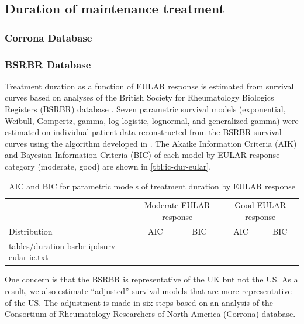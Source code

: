 \documentclass[11pt,final,fleqn]{article}\usepackage[]{graphicx}\usepackage[]{color}
\makeatletter
\theoremstyle{plain}
\newcommand*\ExpandableInput[1]{\@@input#1 }
\makeatother
\begin{document}
\subsection{Duration of maintenance treatment}\label{duration-of-maintenance-treatment}
\subsubsection{Corrona Database}\label{sec:ttd-corrona}
\subsubsection{BSRBR Database}\label{sec:ttd-bsrbr}
Treatment duration as a function of EULAR response is estimated from survival curves based on analyses of the British Society for Rheumatology Biologics Registers (BSRBR) database \citep{stevenson2016adalimumab}. Seven parametric survival models (exponential, Weibull, Gompertz, gamma, log-logistic, lognormal, and generalized gamma) were estimated on individual patient data reconstructed from the BSRBR survival curves using the algorithm developed in \citet{guyot2012enhanced}. The Akaike Information Criteria (AIK) and Bayesian Information Criteria (BIC) of each model by EULAR response category (moderate, good) are shown in \autoref{tbl:ic-dur-eular}.



\begin{table}[!ht]
\begin{center}
\begin{threeparttable}
\caption{AIC and BIC for parametric models of treatment duration by EULAR response} \label{tbl:ic-dur-eular}
\begin{tabularx}{\textwidth}{@{\extracolsep{\fill}}lcccc}
\hline
\multicolumn{1}{l}{} & \multicolumn{2}{c}{Moderate EULAR response} & \multicolumn{2}{c}{Good EULAR response} \\
\cmidrule{2-3} \cmidrule{4-5}
\multicolumn{1}{l}{Distribution} & \multicolumn{1}{c}{AIC} & \multicolumn{1}{c}{BIC} & \multicolumn{1}{c}{AIC}  & \multicolumn{1}{c}{BIC}   \\
\hline
\ExpandableInput{tables/duration-bsrbr-ipdsurv-eular-ic.txt}
\hline
\end{tabularx}
\end{threeparttable}
\end{center}
\end{table}

One concern is that the BSRBR is representative of the UK but not the
US. As a result, we also estimate ``adjusted'' survival models that are
more representative of the US. The adjustment is made in six steps based
on an analysis of the Consortium of Rheumatology Researchers of North
America (Corrona) database.
\end{document}
